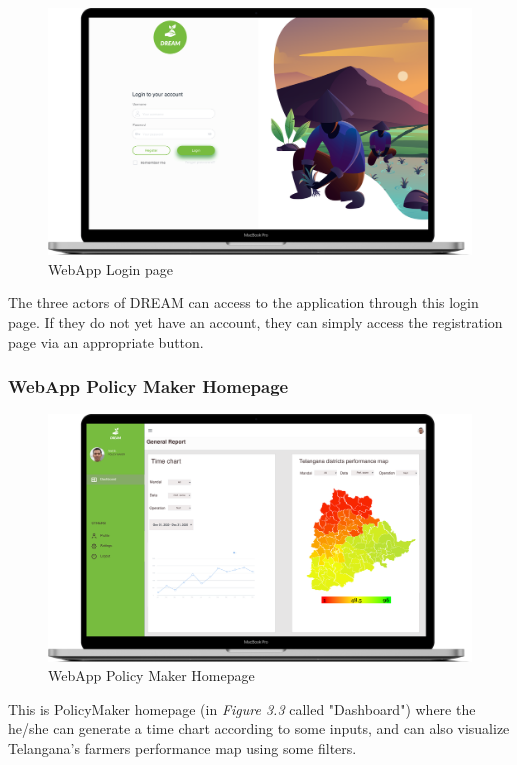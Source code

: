 \begin{figure}[H]
  \centering
  \includegraphics[width=140mm,scale=0.9]{./Images//Mocks/WebApp/Login.png}
  \caption{WebApp Login page}
\end{figure}

The three actors of DREAM can access to the application through this login page. If they do not yet have an account, they can simply access the registration page via an appropriate button.

\subsubsection{WebApp Policy Maker Homepage}

\begin{figure}[H]
  \centering
  \includegraphics[width=140mm,scale=0.9]{./Images//Mocks/WebApp/PolicyMaker.png}
  \caption{WebApp Policy Maker Homepage}
\end{figure}

This is PolicyMaker homepage (in \textit{Figure 3.3} called "Dashboard") where the he/she can generate a time chart according to some inputs, and can also visualize Telangana's farmers performance map using some filters.

